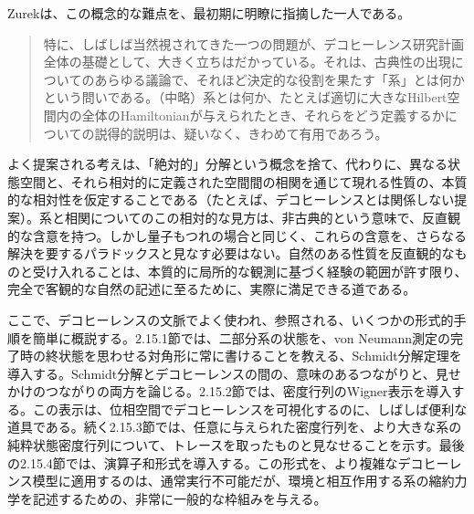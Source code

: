 \hypertarget{srcpage:103}{}\label{srcpage:103}
Zurek\cite[p.~1820]{ref104}は、この概念的な難点を、最初期に明瞭に指摘した一人である。
\begin{quote}
特に、しばしば当然視されてきた一つの問題が、デコヒーレンス研究計画全体の基礎として、大きく立ちはだかっている。それは、古典性の出現についてのあらゆる議論で、それほど決定的な役割を果たす「系」とは何かという問いである。（中略）系とは何か、たとえば適切に大きなHilbert空間内の全体のHamiltonianが与えられたとき、それらをどう定義するかについての説得的説明は、疑いなく、きわめて有用であろう。
\end{quote}
よく提案される考えは、「絶対的」分解という概念を捨て、代わりに、異なる状態空間と、それら相対的に定義された空間間の相関を通じて現れる性質の、本質的な相対性を仮定することである（たとえば、デコヒーレンスとは関係しない提案\cite{ref140,ref141,ref142,ref143}）。系と相関についてのこの相対的な見方は、非古典的という意味で、反直観的な含意を持つ。しかし量子もつれの場合と同じく、これらの含意を、さらなる解決を要するパラドックスと見なす必要はない。自然のある性質を反直観的なものと受け入れることは、本質的に局所的な観測に基づく経験の範囲が許す限り、完全で客観的な自然の記述に至るために、実際に満足できる道である。

ここで、デコヒーレンスの文脈でよく使われ、参照される、いくつかの形式的手順を簡単に概説する。2.15.1節では、二部分系の状態を、von Neumann測定の完了時の終状態を思わせる対角形に常に書けることを教える、Schmidt分解定理を導入する。Schmidt分解とデコヒーレンスの間の、意味のあるつながりと、見せかけのつながりの両方を論じる。2.15.2節では、密度行列のWigner表示を導入する。この表示は、位相空間でデコヒーレンスを可視化するのに、しばしば便利な道具である。続く2.15.3節では、任意に与えられた密度行列を、より大きな系の純粋状態密度行列について、トレースを取ったものと見なせることを示す。最後の2.15.4節では、演算子和形式を導入する。この形式を、より複雑なデコヒーレンス模型に適用するのは、通常実行不可能だが、環境と相互作用する系の縮約力学を記述するための、非常に一般的な枠組みを与える。
